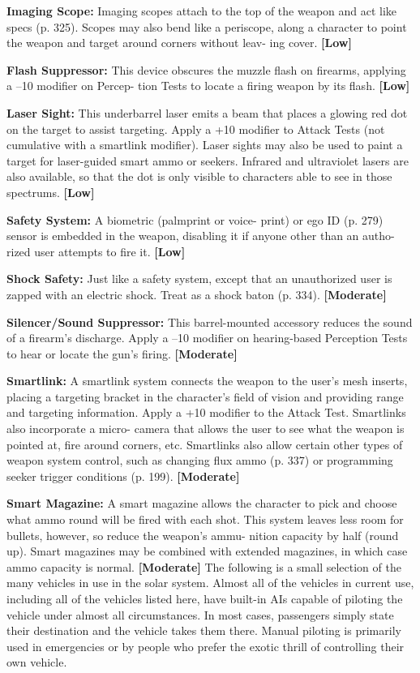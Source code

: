 \textbf{Imaging Scope:} Imaging scopes attach to the top of 
the weapon and act like specs (p. 325). Scopes may 
also bend like a periscope, along a character to point 
the weapon and target around corners without leav-
ing cover. \textbf{[Low]}

\textbf{Flash Suppressor:} This device obscures the muzzle 
flash on firearms, applying a –10 modifier on Percep-
tion Tests to locate a firing weapon by its flash. \textbf{[Low]}

\textbf{Laser Sight:} This underbarrel laser emits a beam 
that places a glowing red dot on the target to assist 
targeting. Apply a +10 modifier to Attack Tests (not 
cumulative with a smartlink modifier). Laser sights 
may also be used to paint a target for laser-guided 
smart ammo or seekers. Infrared and ultraviolet lasers 
are also available, so that the dot is only visible to 
characters able to see in those spectrums. \textbf{[Low]}

\textbf{Safety System: }A biometric (palmprint or voice-
print) or ego ID (p. 279) sensor is embedded in the 
weapon, disabling it if anyone other than an autho-
rized user attempts to fire it. \textbf{[Low]}

\textbf{Shock Safety:} Just like a safety system, except that 
an unauthorized user is zapped with an electric shock. 
Treat as a shock baton (p. 334). \textbf{[Moderate]}

\textbf{Silencer/Sound Suppressor:} This barrel-mounted 
accessory reduces the sound of a firearm's discharge. 
Apply a –10 modifier on hearing-based Perception 
Tests to hear or locate the gun's firing. \textbf{[Moderate]}

\textbf{Smartlink:} A smartlink system connects the weapon 
to the user's mesh inserts, placing a targeting bracket 
in the character's field of vision and providing range 
and targeting information. Apply a +10 modifier to 
the Attack Test. Smartlinks also incorporate a micro-
camera that allows the user to see what the weapon 
is pointed at, fire around corners, etc. Smartlinks also 
allow certain other types of weapon system control, 
such as changing flux ammo (p. 337) or programming 
seeker trigger conditions (p. 199). \textbf{[Moderate]}

\textbf{Smart Magazine:} A smart magazine allows the 
character to pick and choose what ammo round will 
be fired with each shot. This system leaves less room 
for bullets, however, so reduce the weapon's ammu-
nition capacity by half (round up). Smart magazines 
may be combined with extended magazines, in which 
case ammo capacity is normal. \textbf{[Moderate]}
The following is a small selection of the many vehicles 
in use in the solar system. Almost all of the vehicles 
in current use, including all of the vehicles listed here, 
have built-in AIs capable of piloting the vehicle under 
almost all circumstances. In most cases, passengers 
simply state their destination and the vehicle takes 
them there. Manual piloting is primarily used in 
emergencies or by people who prefer the exotic thrill 
of controlling their own vehicle.

